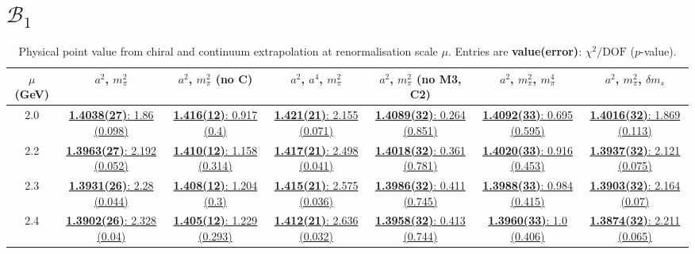 \documentclass[12pt]{extarticle}
\begin{document}
\clearpage
\section{$\mathcal{B}_1$}
\begin{table}[h!]
\begin{center}
\begin{tabular}{|c|c|c|c|c|c|c|}
\hline
$\mu$ (GeV) & $a^2$, $m_\pi^2$& $a^2$, $m_\pi^2$ (no C)& $a^2$, $a^4$, $m_\pi^2$& $a^2$, $m_\pi^2$ (no M3, C2)& $a^2$, $m_\pi^2$, $m_\pi^4$& $a^2$, $m_\pi^2$, $\delta m_s$\\
\hline
2.0& \hyperlink{VVpAA/SUSY/a2m2_20.pdf.1}{\textbf{1.4038(27)}: 1.86 (0.098)} & \hyperlink{VVpAA/SUSY/a2m2noC_20.pdf.1}{\textbf{1.416(12)}: 0.917 (0.4)} & \hyperlink{VVpAA/SUSY/a2a4m2_20.pdf.1}{\textbf{1.421(21)}: 2.155 (0.071)} & \hyperlink{VVpAA/SUSY/a2m2mcut_20.pdf.1}{\textbf{1.4089(32)}: 0.264 (0.851)} & \hyperlink{VVpAA/SUSY/a2m2m4_20.pdf.1}{\textbf{1.4092(33)}: 0.695 (0.595)} & \hyperlink{VVpAA/SUSY/a2m2delm_20.pdf.1}{\textbf{1.4016(32)}: 1.869 (0.113)}\\
2.2& \hyperlink{VVpAA/SUSY/a2m2_22.pdf.1}{\textbf{1.3963(27)}: 2.192 (0.052)} & \hyperlink{VVpAA/SUSY/a2m2noC_22.pdf.1}{\textbf{1.410(12)}: 1.158 (0.314)} & \hyperlink{VVpAA/SUSY/a2a4m2_22.pdf.1}{\textbf{1.417(21)}: 2.498 (0.041)} & \hyperlink{VVpAA/SUSY/a2m2mcut_22.pdf.1}{\textbf{1.4018(32)}: 0.361 (0.781)} & \hyperlink{VVpAA/SUSY/a2m2m4_22.pdf.1}{\textbf{1.4020(33)}: 0.916 (0.453)} & \hyperlink{VVpAA/SUSY/a2m2delm_22.pdf.1}{\textbf{1.3937(32)}: 2.121 (0.075)}\\
2.3& \hyperlink{VVpAA/SUSY/a2m2_23.pdf.1}{\textbf{1.3931(26)}: 2.28 (0.044)} & \hyperlink{VVpAA/SUSY/a2m2noC_23.pdf.1}{\textbf{1.408(12)}: 1.204 (0.3)} & \hyperlink{VVpAA/SUSY/a2a4m2_23.pdf.1}{\textbf{1.415(21)}: 2.575 (0.036)} & \hyperlink{VVpAA/SUSY/a2m2mcut_23.pdf.1}{\textbf{1.3986(32)}: 0.411 (0.745)} & \hyperlink{VVpAA/SUSY/a2m2m4_23.pdf.1}{\textbf{1.3988(33)}: 0.984 (0.415)} & \hyperlink{VVpAA/SUSY/a2m2delm_23.pdf.1}{\textbf{1.3903(32)}: 2.164 (0.07)}\\
2.4& \hyperlink{VVpAA/SUSY/a2m2_24.pdf.1}{\textbf{1.3902(26)}: 2.328 (0.04)} & \hyperlink{VVpAA/SUSY/a2m2noC_24.pdf.1}{\textbf{1.405(12)}: 1.229 (0.293)} & \hyperlink{VVpAA/SUSY/a2a4m2_24.pdf.1}{\textbf{1.412(21)}: 2.636 (0.032)} & \hyperlink{VVpAA/SUSY/a2m2mcut_24.pdf.1}{\textbf{1.3958(32)}: 0.413 (0.744)} & \hyperlink{VVpAA/SUSY/a2m2m4_24.pdf.1}{\textbf{1.3960(33)}: 1.0 (0.406)} & \hyperlink{VVpAA/SUSY/a2m2delm_24.pdf.1}{\textbf{1.3874(32)}: 2.211 (0.065)}\\
\hline
\end{tabular}
\caption{Physical point value from chiral and continuum extrapolation at renormalisation scale $\mu$. Entries are \textbf{value(error)}: $\chi^2/\text{DOF}$ ($p$-value).}
\end{center}
\end{table}
\end{document}

